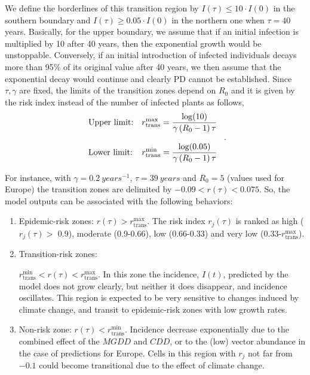 We define the borderlines of this transition region by $I(\tau)\leq10 \cdot
    I(0)$ in the southern boundary and $I(\tau)\geq 0.05 \cdot I(0)$ in the
northern one when $\tau=40$ years. Basically, for the upper boundary, we assume
that if an initial infection is multiplied by 10 after 40 years, then the
exponential growth would be unstoppable. Conversely, if an initial introduction
of infected individuals decays more than 95\% of its original value after 40
years, we then assume that the exponential decay would continue and clearly PD
cannot be established. Since $\tau, \gamma$ are fixed, the limits of the
transition zones depend on $R_0 $ and it is given by the risk index instead of
the number of infected plants as follows,
\begin{equation}
    \begin{array}{ll}
        \displaystyle \textrm{Upper limit:} & \displaystyle

        r_{\textrm{trans}}^{\textrm{max}}=\frac{\log(10)}{\gamma\left(R_0-1\right)\tau}
        \\\\
        \displaystyle \textrm{Lower limit:} & \displaystyle

        r_{\textrm{trans}}^{\textrm{min}}=\frac{\log(0.05)}{\gamma\left(R_0-1\right)\tau}
    \end{array} \ .
\end{equation}

For instance, with $\gamma=\SI{0.2}{years^{-1}}$, $\tau=\SI{39}{years}$ and
$R_0=5$ (values used for Europe) the transition zones are delimited by
$-0.09<r(\tau)<0.075$. So, the model outputs can be associated with the
following behaviors:
\begin{enumerate}
    \item Epidemic-risk zones: $r(\tau)>r_{\textrm{trans}}^{\textrm{max}}$.
          The risk index $r_j(\tau)$ is ranked as high ($r_j(\tau) >$ 0.9),
          moderate
          (0.9-0.66), low (0.66-0.33) and very low
          (0.33-$r_{\textrm{trans}}^{\textrm{max}}$).
    \item Transition-risk zones:

          $r_{\textrm{trans}}^{\textrm{min}}<r(\tau)<r_{\textrm{trans}}^{\textrm{max}}$.
          In this zone the incidence, $I(t)$, predicted by the model does not
          grow
          clearly, but neither it does disappear, and incidence oscillates.
          This region
          is expected to be very sensitive to changes induced by climate
          change, and
          transit to epidemic-risk zones with low growth rates.
    \item Non-risk zone: $r(\tau)<r_{\textrm{trans}}^{\textrm{min}}$.
          Incidence decrease exponentially due to the combined effect of the
          $MGDD$ and
          $CDD$, or to the (low) vector abundance in the case of predictions
          for Europe.
          Cells in this region with $r_j$ not far from $-0.1$ could become
          transitional
          due to the effect of climate change.
\end{enumerate}

